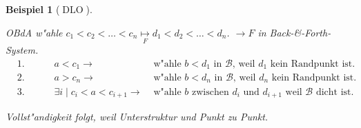 \documentclass[a4paper,12pt,numbers=noenddot,parskip=full]{scrartcl}
\newcommand{\scrB}{\mathcal{B}}
\DeclareMathOperator{\dlo}{DLO}
\theoremstyle{dotless}
\newtheorem{example}[theorem]{Beispiel}
\begin{document}
\begin{example}[$\dlo$]
\begin{enumerate}
		OBdA w"ahle $c_1<c_2<\dots<c_n \underset{F}{\mapsto} d_1<d_2<\dots<d_n$. $\longrightarrow F$ in Back-\&-Forth-System.
		\begin{align*}
			&\text{1. Fall: } &a< c_1 \rightarrow &\text{ w"ahle } b<d_1 \text{ in } \scrB \text{, weil } d_1 \text{ kein Randpunkt ist.}\\
			&\text{2. Fall: } &a>c_n \rightarrow &\text{ w"ahle } b<d_n \text{ in } \scrB \text{, weil } d_n \text{ kein Randpunkt ist.}\\
			&\text{3. Fall: } &\exists i \mid c_i<a<c_{i+1} \rightarrow &\text{ w"ahle } b \text{ zwischen } d_i \text{ und } d_{i+1} \text{ weil } \scrB \text{ dicht ist.}
		\end{align*}
		
		Vollst"andigkeit folgt, weil Unterstruktur und Punkt zu Punkt.
	\end{enumerate}
\end{example}
\end{document}
